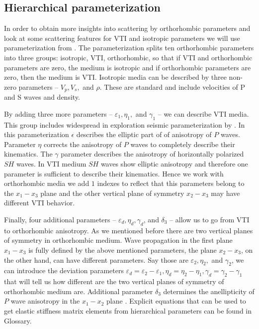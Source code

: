 \subsection{Hierarchical parameterization}

In order to obtain more insights into scattering by orthorhombic parameters and look at some scattering features for VTI and isotropic parameters we will use parameterization from \citep{juwon2016}. The parameterization splits ten orthorhombic parameters into three groups: isotropic, VTI, orthorhombic, so that if VTI and orthorhombic parameters are zero, the medium is isotropic and if orthorhombic parameters are zero, then the medium is VTI.  
Isotropic media can be described by three non-zero parameters -- $V_p,V_s,$ and $\rho$. These are standard and include velocities of P and S waves and density.

By adding three more parameters -- $\varepsilon_1, \eta_1,$ and $\gamma_1$ -- we can describe VTI media. This group includes widespread in exploration seismic parameterization by \cite{alkhalifah2000}. In this parameterization $\epsilon$ describes the elliptic part of of anisotropy of $P$ waves. Parameter $\eta$ corrects the anisotropy of $P$ waves to completely describe their kinematics. The $\gamma$ parameter describes the anisotropy of horizontally polarized $SH$ waves. In VTI medium $SH$ waves show elliptic anisotropy and therefore one parameter is sufficient to describe their kinematics. Hence we work with orthorhombic media we add $1$ indexes to reflect that this parameters belong to the $x_1-x_3$ plane and the other vertical plane of symmetry $x_2-x_3$ may have different VTI behavior. 


Finally, four additional parameters -- $\varepsilon_d, \eta_d, \gamma_d$, and $\delta_3$ -- allow us to go from VTI to orthorhombic anisotropy. As we mentioned before there are two vertical planes of symmetry in orthorhombic medium. Wave propagation in the first plane $x_1-x_3$ is fully defined by the above mentioned parameters, the plane $x_2-x_3$, on the other hand, can have different parameters. Say those are $\varepsilon_2, \eta_2,$ and $\gamma_2$, we can introduce the deviation parameters $\varepsilon_d = \varepsilon_2 - \varepsilon_1, \eta_d = \eta_2 - \eta_1, \gamma_d = \gamma_2 - \gamma_1$ that will tell us how different are the two vertical planes of symmetry of orthorhombic medium are. Additional parameter $\delta_3$ determines the anellipticity of $P$ wave anisotropy in the $x_1-x_2$ plane \citep{juwon2016}. Explicit equations that can be used to get elastic stiffness matrix elements from hierarchical parameters can be found in Glossary. 

